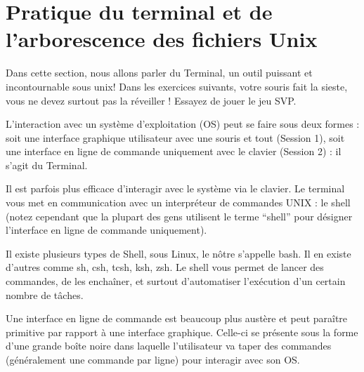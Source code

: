 \documentclass{article}
\begin{document}
\maketitle


\section {Pratique du terminal et de l’arborescence des fichiers Unix}

Dans cette section, nous allons parler du Terminal, un outil puissant et incontournable sous unix! Dans les exercices suivants, votre souris fait la sieste, vous ne devez surtout pas la réveiller !
Essayez de jouer le jeu SVP.

L'interaction avec un système d’exploitation (OS) peut se faire sous deux formes : soit une interface graphique utilisateur avec une souris et tout (Session 1), soit une interface en ligne de commande uniquement avec le clavier (Session 2) : il s'agit du Terminal. 

Il est parfois plus efficace d’interagir avec le système via le clavier. Le terminal vous met en communication avec un interpréteur de
commandes UNIX : le shell (notez cependant que la plupart des gens utilisent le terme ``shell'' pour désigner l’interface en ligne de commande uniquement).

Il existe plusieurs types de Shell, sous Linux, le nôtre s’appelle bash. Il en existe d’autres comme sh, csh, tcsh, ksh, zsh.
Le shell vous permet de lancer des commandes, de les enchaîner, et surtout d’automatiser l’exécution d’un certain nombre de tâches.

Une interface en ligne de commande est beaucoup plus austère et peut paraître primitive par rapport à une interface graphique. Celle-ci se présente sous la forme d’une grande boîte noire dans laquelle l’utilisateur va taper des commandes (généralement une commande par ligne) pour interagir avec son OS.
\end{document}

